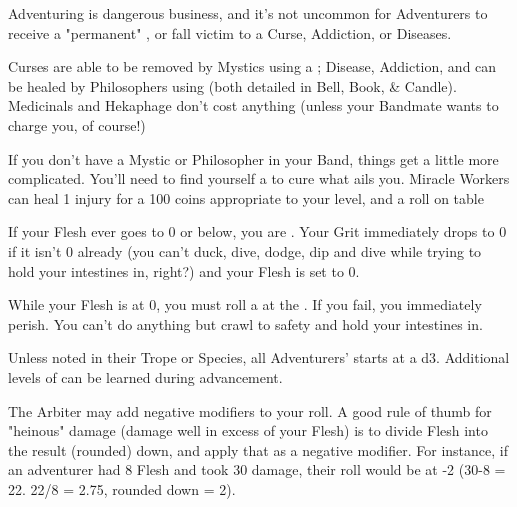 {  

  Adventuring is dangerous business, and it's not uncommon for Adventurers to receive a "permanent" , or fall victim to a Curse, Addiction, or Diseases.

  Curses are able to be removed by Mystics using a ;  Disease, Addiction, and  can be healed by Philosophers using  (both detailed in Bell, Book, \& Candle).  Medicinals and Hekaphage don't cost anything (unless your Bandmate wants to charge you, of course!)

  If you don't have a Mystic or Philosopher in your Band, things get a little more complicated.  You'll need to find yourself a  to cure what ails you.  Miracle Workers can heal 1 injury for a 100 coins appropriate to your level, and a roll on 
   table




  If your Flesh ever goes to 0 or below, you are .  Your Grit immediately drops to 0 if it isn't 0 already (you can't duck, dive, dodge, dip and dive while trying to hold your intestines in, right?) and your Flesh is set to 0.

  While your Flesh is at 0, you must roll a \DEATH at the .  If you fail, you immediately perish.  You can't do anything but crawl to safety and hold your intestines in.

  Unless noted in their Trope or Species, all Adventurers' \DEATH starts at a d3.  Additional levels of \DEATH can be learned during advancement.



  The Arbiter may add negative modifiers to your roll.  A good rule of thumb for "heinous" damage (damage well in excess of your Flesh) is to divide \MAX Flesh into the result (rounded) down, and apply that as a negative modifier.  For instance, if an adventurer had 8 Flesh and took 30 damage, their roll would be at -2 (30-8 = 22.  22/8 = 2.75, rounded down = 2).

}
